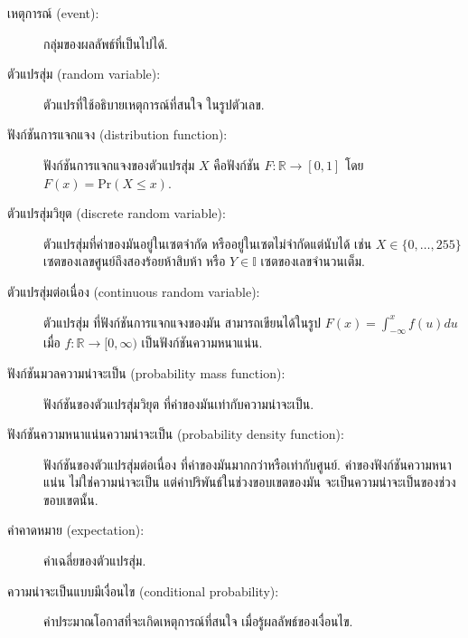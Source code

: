 \begin{description}
\item[เหตุการณ์ (event):]
กลุ่มของผลลัพธ์ที่เป็นไปได้.

\item[ตัวแปรสุ่ม (random variable):]
ตัวแปรที่ใช้อธิบายเหตุการณ์ที่สนใจ
ในรูปตัวเลข. 

\item[ฟังก์ชันการแจกแจง (distribution function):]
ฟังก์ชันการแจกแจงของตัวแปรสุ่ม $X$ คือฟังก์ชัน $F: \mathbb{R} \rightarrow [0,1]$ โดย $F(x) = \mathrm{Pr}(X \leq x)$.

\item[ตัวแปรสุ่มวิยุต (discrete random variable):]	
 
ตัวแปรสุ่มที่ค่าของมันอยู่ในเซตจำกัด 
หรืออยู่ในเซตไม่จำกัดแต่นับได้ 
เช่น 
$X \in \{0, \ldots, 255\}$
เซตของเลขศูนย์ถึงสองร้อยห้าสิบห้า
หรือ
$Y \in \mathbb{I}$ เซตของเลขจำนวนเต็ม.

\item[ตัวแปรสุ่มต่อเนื่อง (continuous random variable):]	
ตัวแปรสุ่ม
ที่ฟังก์ชันการแจกแจงของมัน สามารถเขียนได้ในรูป
$F(x) = \int_{-\infty}^x f(u) du$ เมื่อ $f: \mathbb{R} \rightarrow [0, \infty)$ เป็นฟังก์ชันความหนาแน่น.

\item[ฟังก์ชันมวลความน่าจะเป็น (probability mass function):]
ฟังก์ชันของตัวแปรสุ่มวิยุต
ที่ค่าของมันเท่ากับความน่าจะเป็น.

\item[ฟังก์ชันความหนาแน่นความน่าจะเป็น (probability density function):]
ฟังก์ชันของตัวแปรสุ่มต่อเนื่อง
ที่ค่าของมันมากกว่าหรือเท่ากับศูนย์.
ค่าของฟังก์ชันความหนาแน่น
ไม่ใช่ความน่าจะเป็น
แต่ค่าปริพันธ์ในช่วงขอบเขตของมัน 
จะเป็นความน่าจะเป็นของช่วงขอบเขตนั้น.

\item[ค่าคาดหมาย (expectation):]
 
ค่าเฉลี่ยของตัวแปรสุ่ม.

\item[ความน่าจะเป็นแบบมีเงื่อนไข (conditional probability):]
ค่าประมาณโอกาสที่จะเกิดเหตุการณ์ที่สนใจ
เมื่อรู้ผลลัพธ์ของเงื่อนไข.


\end{description}
